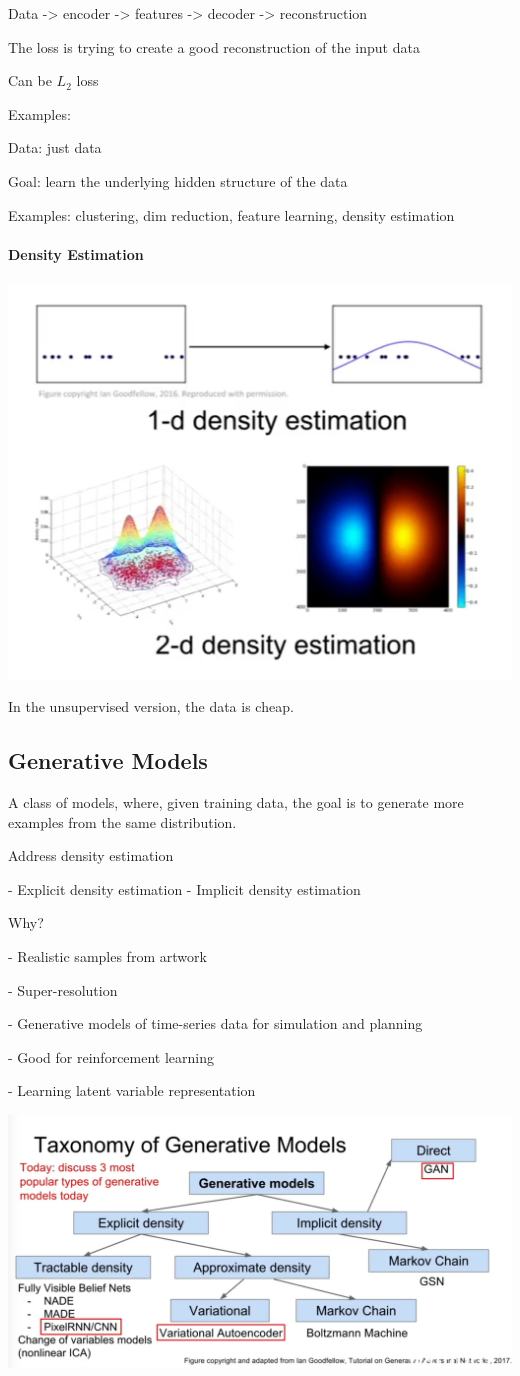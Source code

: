 Data -> encoder -> features -> decoder -> reconstruction

The loss is trying to create a good reconstruction of the input data

Can be $L_2$ loss

Examples: 

Data: just data

Goal: learn the underlying hidden structure of the data

Examples: clustering, dim reduction, feature learning, density estimation

\paragraph{Density Estimation}

\includegraphics[width=0.5\columnwidth]{fei_fei_li/lecture_13/density.png}

In the unsupervised version, the data is cheap.



\subsection{Generative Models}

A class of models, where, given training data, the goal is to generate more examples from the same distribution.

Address density estimation 

- Explicit density estimation
- Implicit density estimation

Why?

- Realistic samples from artwork 

- Super-resolution

- Generative models of time-series data for simulation and planning

  - Good for reinforcement learning

- Learning latent variable representation

  \includegraphics[width=0.5\columnwidth]{fei_fei_li/lecture_13/taxonomy.png}

